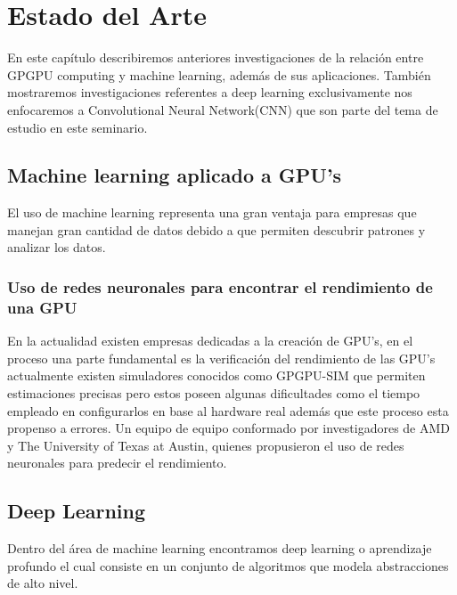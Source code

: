 \chapter{Estado del Arte}
En este capítulo describiremos anteriores investigaciones de la relación entre GPGPU computing y machine learning, además de sus aplicaciones. También mostraremos investigaciones referentes a deep learning exclusivamente nos enfocaremos a Convolutional Neural Network(CNN) que son parte del tema de estudio en este seminario. 




\section{Machine learning aplicado a GPU's}
El uso de machine learning representa una gran ventaja para empresas que manejan gran cantidad de datos debido a que permiten descubrir patrones y analizar los datos.

\subsection{Uso de redes neuronales para encontrar el rendimiento de una GPU}
En la actualidad existen empresas dedicadas a la creación de GPU's, en el proceso una parte fundamental es la verificación del rendimiento de las GPU's actualmente existen simuladores conocidos como GPGPU-SIM que permiten estimaciones precisas pero estos poseen algunas dificultades como el tiempo empleado en configurarlos en base al hardware real además que este proceso esta propenso a errores. Un equipo de equipo conformado por investigadores de AMD y The University of Texas at Austin, quienes propusieron el uso de redes neuronales para predecir el rendimiento.
\section{Deep Learning}
Dentro del área de machine learning  encontramos deep learning o aprendizaje profundo el cual consiste en un conjunto de algoritmos que modela abstracciones de alto nivel.

